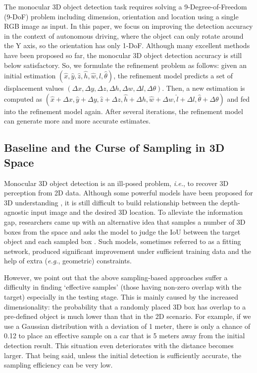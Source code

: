 \documentclass[runningheads]{llncs}
\begin{document}
The monocular 3D object detection task requires solving a 9-Degree-of-Freedom (9-DoF) problem including dimension, orientation and location using a single RGB image as input. In this paper, we focus on improving the detection accuracy in the context of autonomous driving, where the object can only rotate around the Y axis, so the orientation has only 1-DoF. Although many excellent methods have been proposed so far, the monocular 3D object detection accuracy is still below satisfactory. So, we formulate the refinement problem as follows: given an initial estimation $(\hat{x}, \hat{y}, \hat{z}, \hat{h}, \hat{w}, \hat{l},\hat{\theta})$, the refinement model predicts a set of displacement values $(\Delta x, \Delta y, \Delta z, \Delta h, \Delta w, \Delta l, \Delta \theta)$. Then, a new estimation is computed as $(\hat{x}+\Delta x, \hat{y}+\Delta y, \hat{z}+\Delta z, \hat{h}+\Delta h, \hat{w}+\Delta w, \hat{l}+\Delta l, \hat{\theta}+\Delta \theta)$ and fed into the refinement model again. After several iterations, the refinement model can generate more and more accurate estimates.

\subsection{Baseline and the Curse of Sampling in 3D Space}
Monocular 3D object detection is an ill-posed problem, \textit{i.e.}, to recover 3D perception from 2D data. Although some powerful models have been proposed for 3D understanding \cite{mousavian20173d,qin2019monogrnet,brazil2019m3d}, it is still difficult to build relationship between the depth-agnostic input image and the desired 3D location. To alleviate the information gap, researchers came up with an alternative idea that samples a number of 3D boxes from the space and asks the model to judge the IoU between the target object and each sampled box \cite{liu2019deep}. Such models, sometimes referred to as a fitting network, produced significant improvement under sufficient training data and the help of extra (\textit{e.g.}, geometric) constraints.

However, we point out that the above sampling-based approaches suffer a difficulty in finding `effective samples' (those having non-zero overlap with the target) especially in the testing stage. This is mainly caused by the increased dimensionality: the probability that a randomly placed 3D box has overlap to a pre-defined object is much lower than that in the 2D scenario. For example, if we use a Gaussian distribution with a deviation of 1 meter, there is only a chance of 0.12 to place an effective sample on a car that is 5 meters away from the initial detection result. This situation even deteriorates with the distance becomes larger. That being said, unless the initial detection is sufficiently accurate, the sampling efficiency can be very low.
\end{document}
